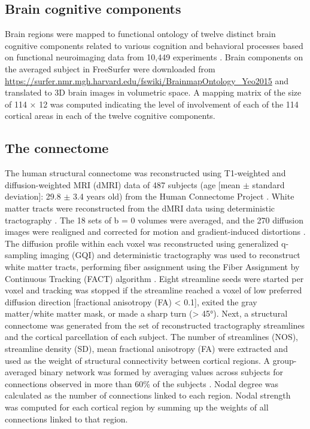 \begin{refsection}
\subsection*{Brain cognitive components}
Brain regions were mapped to functional ontology of twelve distinct brain cognitive components related to various cognition and behavioral processes based on functional neuroimaging data from 10,449 experiments \citep{Yeo2016GraphMO}. Brain components on the averaged subject in FreeSurfer were downloaded from \url{ https://surfer.nmr.mgh.harvard.edu/fswiki/BrainmapOntology\_Yeo2015} and translated to 3D brain images in volumetric space. A mapping matrix of the size of 114 × 12 was computed indicating the level of involvement of each of the 114 cortical areas in each of the twelve cognitive components.

\subsection*{The connectome}
The human structural connectome was reconstructed using T1-weighted and diffusion-weighted MRI (dMRI) data of 487 subjects (age [mean $\mathsf{\pm}$ standard deviation]: 29.8 $\mathsf{\pm}$ 3.4 years old) from the Human Connectome Project \citep{VANESSEN201362}. White matter tracts were reconstructed from the dMRI data using deterministic tractography \citep{VANDENHEUVEL2016293,WEI2019bigbrain}. The 18 sets of b = 0 volumes were averaged, and the 270 diffusion images were realigned and corrected for motion and gradient-induced distortions \citep{ANDERSSON2002177}. The diffusion profile within each voxel was reconstructed using generalized q-sampling imaging (GQI) \citep{YEH2010} and deterministic tractography was used to reconstruct white matter tracts, performing fiber assignment using the Fiber Assignment by Continuous Tracking (FACT) algorithm \citep{MORI1999}. Eight streamline seeds were started per voxel and tracking was stopped if the streamline reached a voxel of low preferred diffusion direction [fractional anisotropy (FA) < 0.1], exited the gray matter/white matter mask, or made a sharp turn (> 45°). Next, a structural connectome was generated from the set of reconstructed tractography streamlines and the cortical parcellation of each subject. The number of streamlines (NOS), streamline density (SD),  mean fractional anisotropy (FA) were extracted and used as the weight of structural connectivity between cortical regions. A group-averaged binary network was formed by averaging values across subjects for connections observed in more than 60\% of the subjects \citep{Reus2013EstimatingFP}. Nodal degree was calculated as the number of connections linked to each region. Nodal strength was computed for each cortical region by summing up the weights of all connections linked to that region.


\end{refsection}
